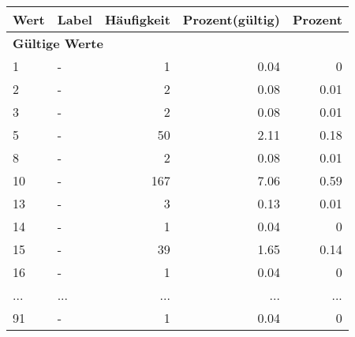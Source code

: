      \begin{longtable}{lXrrr}
     \toprule
     \textbf{Wert} & \textbf{Label} & \textbf{Häufigkeit} & \textbf{Prozent(gültig)} & \textbf{Prozent} \\
     \endhead
     \midrule
     \multicolumn{5}{l}{\textbf{Gültige Werte}}\\
        1 & \multicolumn{1}{X}{-} & %
          \num{1} &
          \num[round-mode=places,round-precision=2]{0.04} &
          \num[round-mode=places,round-precision=2]{0} \\
        2 & \multicolumn{1}{X}{-} & %
          \num{2} &
          \num[round-mode=places,round-precision=2]{0.08} &
          \num[round-mode=places,round-precision=2]{0.01} \\
        3 & \multicolumn{1}{X}{-} & %
          \num{2} &
          \num[round-mode=places,round-precision=2]{0.08} &
          \num[round-mode=places,round-precision=2]{0.01} \\
        5 & \multicolumn{1}{X}{-} & %
          \num{50} &
          \num[round-mode=places,round-precision=2]{2.11} &
          \num[round-mode=places,round-precision=2]{0.18} \\
        8 & \multicolumn{1}{X}{-} & %
          \num{2} &
          \num[round-mode=places,round-precision=2]{0.08} &
          \num[round-mode=places,round-precision=2]{0.01} \\
        10 & \multicolumn{1}{X}{-} & %
          \num{167} &
          \num[round-mode=places,round-precision=2]{7.06} &
          \num[round-mode=places,round-precision=2]{0.59} \\
        13 & \multicolumn{1}{X}{-} & %
          \num{3} &
          \num[round-mode=places,round-precision=2]{0.13} &
          \num[round-mode=places,round-precision=2]{0.01} \\
        14 & \multicolumn{1}{X}{-} & %
          \num{1} &
          \num[round-mode=places,round-precision=2]{0.04} &
          \num[round-mode=places,round-precision=2]{0} \\
        15 & \multicolumn{1}{X}{-} & %
          \num{39} &
          \num[round-mode=places,round-precision=2]{1.65} &
          \num[round-mode=places,round-precision=2]{0.14} \\
        16 & \multicolumn{1}{X}{-} & %
          \num{1} &
          \num[round-mode=places,round-precision=2]{0.04} &
          \num[round-mode=places,round-precision=2]{0} \\
       ... & ... & ... & ... & ... \\
        91 & \multicolumn{1}{X}{-} & %
          \num{1} &
          \num[round-mode=places,round-precision=2]{0.04} &
          \num[round-mode=places,round-precision=2]{0} \\


\end{longtable}
